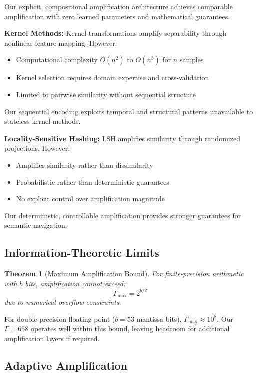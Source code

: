 \documentclass[12pt,a4paper]{article}
\newtheorem{theorem}{Theorem}
\begin{document}
Our explicit, compositional amplification architecture achieves comparable amplification with zero learned parameters and mathematical guarantees.

\textbf{Kernel Methods:} Kernel transformations amplify separability through nonlinear feature mapping. However:
\begin{itemize}
\item Computational complexity $O(n^2)$ to $O(n^3)$ for $n$ samples
\item Kernel selection requires domain expertise and cross-validation
\item Limited to pairwise similarity without sequential structure
\end{itemize}

Our sequential encoding exploits temporal and structural patterns unavailable to stateless kernel methods.

\textbf{Locality-Sensitive Hashing:} LSH amplifies similarity through randomized projections. However:
\begin{itemize}
\item Amplifies similarity rather than dissimilarity
\item Probabilistic rather than deterministic guarantees
\item No explicit control over amplification magnitude
\end{itemize}

Our deterministic, controllable amplification provides stronger guarantees for semantic navigation.

\subsection{Information-Theoretic Limits}

\begin{theorem}[Maximum Amplification Bound]
For finite-precision arithmetic with $b$ bits, amplification cannot exceed:
\begin{equation}
\Gamma_{\max} = 2^{b/2}
\end{equation}
due to numerical overflow constraints.
\end{theorem}

For double-precision floating point ($b = 53$ mantissa bits), $\Gamma_{\max} \approx 10^8$. Our $\Gamma = 658$ operates well within this bound, leaving headroom for additional amplification layers if required.

\subsection{Adaptive Amplification}
\end{document}
